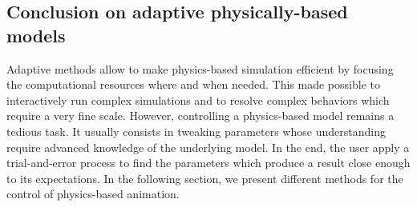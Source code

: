 \subsection{Conclusion on adaptive physically-based models}
Adaptive methods allow to make physics-based simulation efficient by focusing the computational resources where and when needed. 
This made possible to interactively run complex simulations and to resolve complex behaviors which require a very fine scale.
However, controlling a physics-based model remains a tedious task. 
It usually consists in tweaking parameters whose understanding require advanced knowledge of the underlying model. 
In the end, the user apply a trial-and-error process to find the parameters which produce a result close enough to its expectations.
In the following section, we present different methods for the control of physics-based animation.
